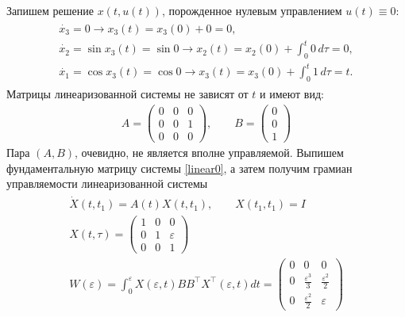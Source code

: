 \documentclass[../main.tex]{subfiles}
\begin{document}
    Запишем решение $ x(t,u(t)) $, порожденное нулевым управлением $ u(t) \equiv 0 $:
    \begin{gather*}
        \begin{gathered}
            \dot{x_3} = 0 \longrightarrow x_3(t) = x_3(0) + 0 = 0, \\
            \dot{x_2} = \sin x_3(t) = \sin 0 \longrightarrow x_2(t) = x_2(0) + \int_0^t 0 \, d\tau = 0,\\
            \dot{x_1} = \cos x_3(t) = \cos 0 \longrightarrow x_3(t) = x_3(0) + \int_0^t    1 \, d\tau = t.
        \end{gathered}
    \end{gather*}
    Матрицы линеаризованной системы не зависят от $ t $ и имеют вид:
    \begin{gather}\label{linear0}
        A = \begin{pmatrix}
            0 & 0 & 0 \\ 
            0 & 0 & 1 \\ 
            0 & 0 & 0
        \end{pmatrix}, \qquad  B = \begin{pmatrix}
            0 \\ 
            0 \\ 
            1
        \end{pmatrix} 
    \end{gather}
    Пара $ (A,B) $, очевидно, не является вполне управляемой.
    Выпишем фундаментальную матрицу системы \eqref{linear0}, а затем получим грамиан управляемости линеаризованной системы
    \begin{gather*}
        \begin{gathered}
            \dot{X}(t,t_1) = A(t) X(t,t_1), \qquad X(t_1,t_1) = I \\
            X(t,\tau) = \begin{pmatrix}
                1 & 0 & 0 \\ 
                0 & 1 & \varepsilon \\ 
                0 & 0 & 1
            \end{pmatrix}  \\
            W(\varepsilon) = \int_0^{\varepsilon}X(\varepsilon,t) B B^{\top} X^{\top}(\varepsilon,t)dt 
            =\begin{pmatrix}
                0 & 0 & 0 \\
                0 & \frac{\varepsilon^3}{3} & \frac{\varepsilon^2}{2} \\
                0 &  \frac{\varepsilon^2}{2} & \varepsilon
            \end{pmatrix} 
        \end{gathered}
    \end{gather*}
\end{document}
